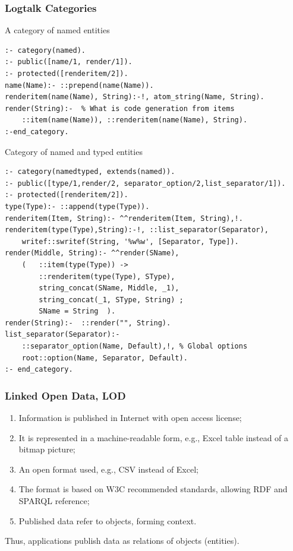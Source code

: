 \documentclass[10pt]{beamer}
\begin{document}
\begin{frame}[fragile]
  \frametitle{Logtalk Categories}
  A category of named entities
\begin{verbatim}
:- category(named).
:- public([name/1, render/1]).
:- protected([renderitem/2]).
name(Name):- ::prepend(name(Name)).
renderitem(name(Name), String):-!, atom_string(Name, String).
render(String):-  % What is code generation from items
    ::item(name(Name)), ::renderitem(name(Name), String).
:-end_category.
\end{verbatim}
Category of named and typed entities
\begin{verbatim}
:- category(namedtyped, extends(named)).
:- public([type/1,render/2, separator_option/2,list_separator/1]).
:- protected([renderitem/2]).
type(Type):- ::append(type(Type)).
renderitem(Item, String):- ^^renderitem(Item, String),!.
renderitem(type(Type),String):-!, ::list_separator(Separator),
    writef::swritef(String, '%w%w', [Separator, Type]).
render(Middle, String):- ^^render(SName),
    (   ::item(type(Type)) ->
        ::renderitem(type(Type), SType),
        string_concat(SName, Middle, _1),
        string_concat(_1, SType, String) ;
        SName = String  ).
render(String):-  ::render("", String).
list_separator(Separator):-
    ::separator_option(Name, Default),!, % Global options
    root::option(Name, Separator, Default).
:- end_category.

\end{verbatim}
\end{frame}

\begin{frame}
  \frametitle{Linked Open Data, LOD}
  \begin{enumerate}
  \item Information is published in Internet with open access license;
  \item It is represented in a machine-readable form, e.g., Excel table instead of a bitmap picture;
  \item An open format used, e.g., CSV instead of Excel;
  \item The format is based on W3C recommended standards, allowing RDF and SPARQL reference;
  \item Published data refer to objects, forming context.
  \end{enumerate}
  Thus, applications publish data as relations of objects (entities).
\end{frame}
\end{document}
